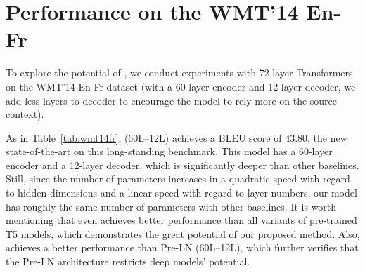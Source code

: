 \section{Performance on the WMT'14 En-Fr}
\label{appendix:enfr}

To explore the potential of \our, we conduct experiments with 72-layer Transformers on the WMT'14 En-Fr dataset (with a 60-layer encoder and 12-layer decoder, we add less layers to decoder to encourage the model to rely more on the source context). 

As in Table~\ref{tab:wmt14fr}, \our (60L--12L) achieves a BLEU score of 43.80, the new state-of-the-art on this long-standing benchmark. 
This model has a 60-layer encoder and a 12-layer decoder, which is significantly deeper than other baselines.
Still, since the number of parameters increases in a quadratic speed with regard to hidden dimensions and a linear speed with regard to layer numbers, our model has roughly the same number of parameters with other baselines. 
It is worth mentioning that \our even achieves better performance than all variants of pre-trained T5 models, which demonstrates the great potential of our proposed method.
Also, \our achieves a better performance than Pre-LN (60L--12L), which further verifies that the Pre-LN architecture restricts deep models' potential. 




